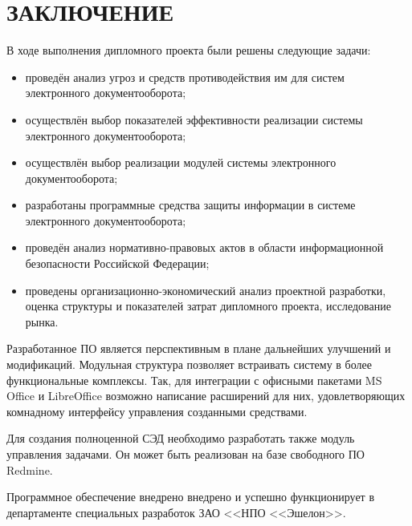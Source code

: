 \chapter*{ЗАКЛЮЧЕНИЕ}						%

В ходе выполнения дипломного проекта были решены следующие задачи:
\begin{itemize}
	\item проведён анализ угроз и средств противодействия им для систем электронного документооборота;
	\item осуществлён выбор показателей эффективности реализации системы электронного документооборота;
	\item осуществлён выбор реализации модулей системы электронного документооборота;
	\item разработаны программные средства защиты информации в системе электронного документооборота;
	\item проведён анализ нормативно-правовых актов в области информационной безопасности Российской Федерации;
	\item проведены организационно-экономический анализ проектной разработки, оценка структуры и показателей затрат дипломного проекта, исследование рынка.
\end{itemize}

\vspace{\baselineskip}
Разработанное ПО является перспективным в плане дальнейших улучшений и модификаций. Модульная структура позволяет встраивать систему в более функциональные комплексы. Так, для интеграции с офисными пакетами MS Office и LibreOffice возможно написание расширений для них, удовлетворяющих комнадному интерфейсу управления созданными средствами.

Для создания полноценной СЭД необходимо разработать также модуль управления задачами. Он может быть реализован на базе свободного ПО Redmine.

\vspace{\baselineskip}
Программное обеспечение внедрено внедрено и успешно функционирует в департаменте специальных разработок ЗАО <<НПО <<Эшелон>>.

\clearpage
